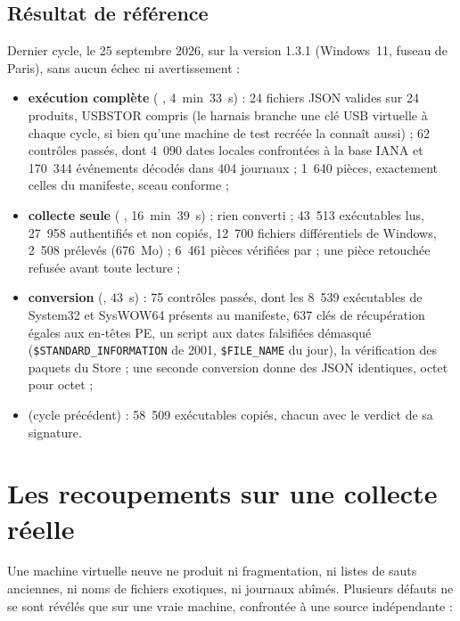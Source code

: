 \documentclass[11pt,a4paper,oneside]{report}
\begin{document}
\section{Résultat de référence}

Dernier cycle, le 25 septembre 2026, sur la version 1.3.1 (Windows~11, fuseau
de Paris), sans aucun échec ni avertissement :

\begin{itemize}
  \item \textbf{exécution complète} ( , 4~min~33~s) :
    24 fichiers JSON valides sur 24 produits, USBSTOR compris (le harnais
    branche une clé USB virtuelle à chaque cycle, si bien qu'une machine de
    test recréée la connaît aussi) ; 62 contrôles passés, dont 4~090 dates
    locales confrontées à la base IANA et 170~344 événements décodés dans
    404 journaux ; 1~640 pièces, exactement celles du manifeste, sceau conforme ;
  \item \textbf{collecte seule} (  ,
    16~min~39~s) : rien converti ; 43~513 exécutables lus, 27~958 authentifiés et non
    copiés, 12~700 fichiers différentiels de Windows, 2~508 prélevés (676~Mo) ;
    6~461 pièces vérifiées par  ; une pièce
    retouchée refusée avant toute lecture ;
  \item \textbf{conversion} (, 43~s) : 75 contrôles passés, dont
    les 8~539 exécutables de System32 et SysWOW64 présents au manifeste,
    637 clés de récupération égales aux en-têtes PE, un script aux dates
    falsifiées démasqué (\texttt{\$STANDARD\_\allowbreak INFORMATION} de 2001, \texttt{\$FILE\_NAME} du jour), la
    vérification des paquets du Store ; une seconde conversion donne des JSON
    identiques, octet pour octet ;
  \item \textbf{} (cycle précédent) : 58~509 exécutables
    copiés, chacun avec le verdict de sa signature.
\end{itemize}

\chapter{Les recoupements sur une collecte réelle}\label{ch:reel}

Une machine virtuelle neuve ne produit ni fragmentation, ni listes de sauts
anciennes, ni noms de fichiers exotiques, ni journaux abîmés. Plusieurs
défauts ne se sont révélés que sur une vraie machine, confrontée à une source
indépendante :
\end{document}
